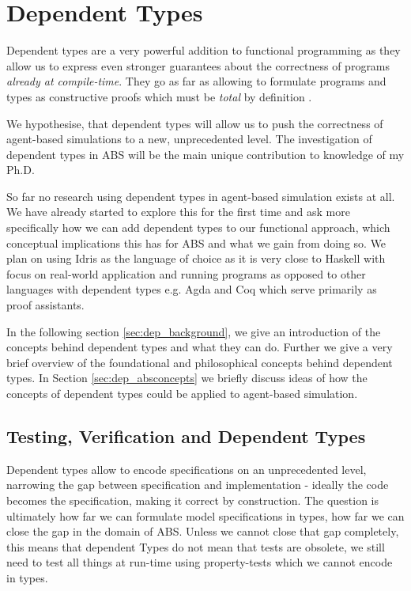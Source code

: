 \chapter{Dependent Types}
\label{chap:dependent_types}
Dependent types are a very powerful addition to functional programming as they allow us to express even stronger guarantees about the correctness of programs \textit{already at compile-time}. They go as far as allowing to formulate programs and types as constructive proofs which must be \textit{total} by definition \cite{thompson_type_1991, mckinna_why_2006, altenkirch_pi_2010}. 

We hypothesise, that  dependent types will allow us to push the correctness of agent-based simulations to a new, unprecedented level. The investigation of dependent types in ABS will be the main unique contribution to knowledge of my Ph.D.

So far no research using dependent types in agent-based simulation exists at all. We have already started to explore this for the first time and ask more specifically how we can add dependent types to our functional approach, which conceptual implications this has for ABS and what we gain from doing so. We plan on using Idris \cite{brady_idris_2013} as the language of choice as it is very close to Haskell with focus on real-world application and running programs as opposed to other languages with dependent types e.g. Agda and Coq which serve primarily as proof assistants.

In the following section \ref{sec:dep_background}, we give an introduction of the concepts behind dependent types and what they can do. Further we give a very brief overview of the foundational and philosophical concepts behind dependent types. In Section \ref{sec:dep_absconcepts} we briefly discuss ideas of how the concepts of dependent types could be applied to agent-based simulation.





\section{Testing, Verification and Dependent Types}
Dependent types allow to encode specifications on an unprecedented level, narrowing the gap between specification and implementation - ideally the code becomes the specification, making it correct by construction. The question is ultimately how far we can formulate model specifications in types, how far we can close the gap in the domain of ABS. Unless we cannot close that gap completely, this means that dependent Types do not mean that tests are obsolete, we still need to test all things at run-time using property-tests which we cannot encode in types.

